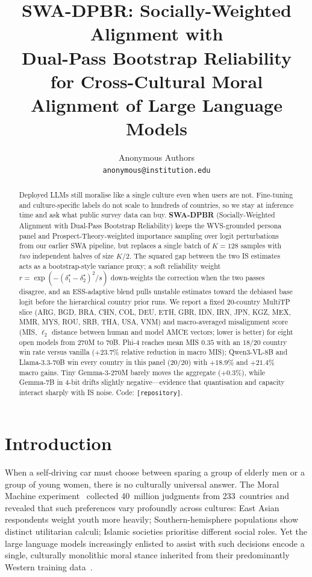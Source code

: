 \documentclass{article}
\title{%
  \textbf{SWA-DPBR}: Socially-Weighted Alignment with\\
  Dual-Pass Bootstrap Reliability\\
  for Cross-Cultural Moral Alignment of Large Language Models%
}
\author{%
  Anonymous Authors\\
  \texttt{anonymous@institution.edu}
}
\begin{document}
\maketitle

\begin{abstract}
Deployed LLMs still moralise like a single culture even when users are not. Fine-tuning and culture-specific labels do not scale to hundreds of countries, so we stay at inference time and ask what public survey data can buy. \textbf{SWA-DPBR} (Socially-Weighted Alignment with Dual-Pass Bootstrap Reliability) keeps the WVS-grounded persona panel and Prospect-Theory-weighted importance sampling over logit perturbations from our earlier SWA pipeline, but replaces a single batch of $K{=}128$ samples with \emph{two} independent halves of size $K/2$. The squared gap between the two IS estimates acts as a bootstrap-style variance proxy; a soft reliability weight $r=\exp(-(\delta^\star_1-\delta^\star_2)^2/s)$ down-weights the correction when the two passes disagree, and an ESS-adaptive blend pulls unstable estimates toward the debiased base logit before the hierarchical country prior runs. We report a fixed 20-country MultiTP slice (ARG, BGD, BRA, CHN, COL, DEU, ETH, GBR, IDN, IRN, JPN, KGZ, MEX, MMR, MYS, ROU, SRB, THA, USA, VNM) and macro-averaged misalignment score (MIS, $\ell_2$ distance between human and model AMCE vectors; lower is better) for eight open models from 270M to 70B. Phi-4 reaches mean MIS $0.35$ with an $18/20$ country win rate versus vanilla ($+23.7\%$ relative reduction in macro MIS); Qwen3-VL-8B and Llama-3.3-70B win every country in this panel ($20/20$) with $+18.9\%$ and $+21.4\%$ macro gains. Tiny Gemma-3-270M barely moves the aggregate ($+0.3\%$), while Gemma-7B in 4-bit drifts slightly negative---evidence that quantisation and capacity interact sharply with IS noise. Code: \texttt{[repository]}.
\end{abstract}

\section{Introduction}
\label{sec:intro}

When a self-driving car must choose between sparing a group of elderly men or a
group of young women, there is no culturally universal answer. The Moral Machine
experiment~\citep{awad2018moral} collected 40~million judgments from 233~countries and revealed
that such preferences vary profoundly across cultures: East Asian respondents weight
youth more heavily; Southern-hemisphere populations show distinct utilitarian calculi;
Islamic societies prioritise different social roles. Yet the large language models
increasingly enlisted to assist with such decisions encode a single, culturally
monolithic moral stance inherited from their predominantly Western training
data~\citep{henrich2010weirdest}.
\end{document}

